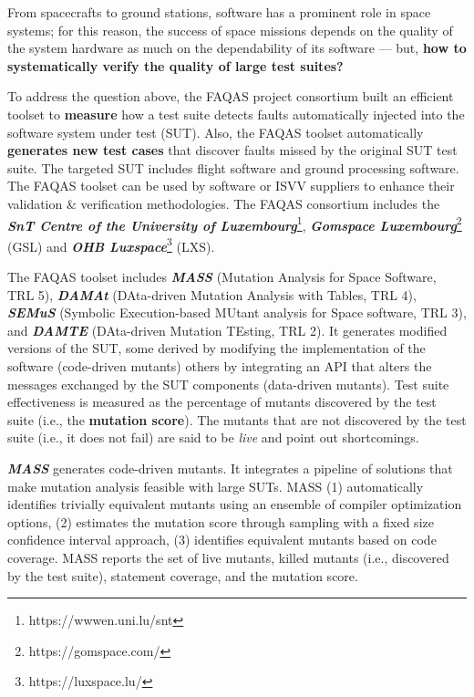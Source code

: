 \documentclass[a4paper]{report}
\begin{document}

From spacecrafts to ground stations, software has a prominent role in space systems; for this reason, the success of space missions depends on the quality of the system hardware as much on the dependability of its software --- but, \textbf{how to systematically verify the quality of large test suites?} 

To address the question above, the FAQAS project consortium built an efficient toolset to 
\textbf{measure} how a test suite detects faults automatically injected into the software system under test (SUT). Also, the FAQAS toolset automatically \textbf{generates new test cases} that discover faults missed by the original SUT test suite. The targeted SUT includes flight software and ground processing software.
The FAQAS toolset can be used by software or ISVV suppliers to enhance their validation  \&  verification methodologies.
The FAQAS consortium includes the \textbf{\emph{SnT Centre of the University of Luxembourg}}\footnote{https://wwwen.uni.lu/snt}, \textbf{\emph{Gomspace Luxembourg}}\footnote{https://gomspace.com/} (GSL) and \textbf{\emph{OHB Luxspace}}\footnote{https://luxspace.lu/} (LXS).

The FAQAS toolset includes 
\textbf{\emph{MASS}} (Mutation Analysis for Space Software, TRL 5), 
\textbf{\emph{DAMAt}} (DAta-driven Mutation Analysis with Tables, TRL 4), 
\textbf{\emph{SEMuS}} (Symbolic Execu\-tion-based MUtant analysis for Space software, TRL 3),
and \textbf{\emph{DAMTE}} (DAta-driven Mutation TEsting, TRL 2).
It generates modified versions of the SUT, some derived by modifying the implementation of the software (code-driven mutants) others by integrating an API that alters the messages exchanged by the SUT components (data-driven mutants). 
Test suite effectiveness is measured as the percentage of mutants discovered by the test suite (i.e., the \textbf{mutation score}). The mutants that are not discovered by the test suite (i.e., it does not fail) are said to be \emph{live} and point out shortcomings.

\textbf{\emph{MASS}} generates code-driven mutants. It integrates a pipeline of solutions that make mutation analysis feasible with large SUTs. MASS (1) automatically identifies trivially equivalent mutants using an ensemble of compiler optimization options, (2) estimates the mutation score through sampling with a fixed size confidence interval approach, (3) identifies equivalent mutants based on code coverage. 
MASS reports the set of live mutants, killed mutants (i.e., discovered by the test suite), statement coverage, and the mutation score.
\end{document}
